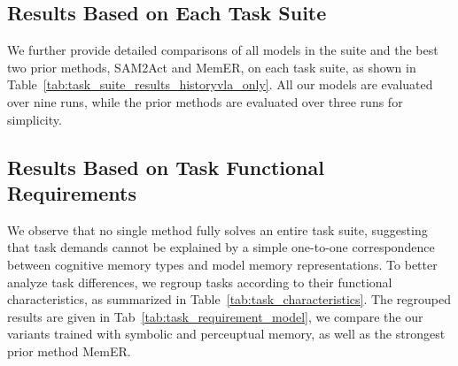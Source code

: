 \clearpage
\subsection{Results Based on Each Task Suite}
\label{sec:results_suite_breakdown}

We further provide detailed comparisons of all models in the \modelname\xspace suite and the best two prior methods, SAM2Act and MemER, on each task suite, as shown in Table~\ref{tab:task_suite_results_historyvla_only}. 
All our \modelname\xspace models are evaluated over nine runs, while the prior methods are evaluated over three runs for simplicity.




\clearpage
\subsection{Results Based on Task Functional Requirements}
\label{sec:result_task_function}

We observe that no single method fully solves an entire task suite, suggesting that task demands cannot be explained by a simple one-to-one correspondence between cognitive memory types and model memory representations. 
To better analyze task differences, we regroup tasks according to their functional characteristics, as summarized in Table~\ref{tab:task_characteristics}. The regrouped results are given in Tab~\ref{tab:task_requirement_model}, we compare the our \modelname\xspace variants trained with symbolic and perceuptual memory, as well as the strongest prior method MemER.

